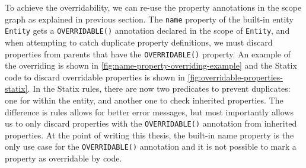       To achieve the overridability, we can re-use the property annotations in the scope graph as explained in previous section. The \texttt{name} property of the built-in entity \texttt{Entity} gets a \texttt{OVERRIDABLE()} annotation declared in the scope of \texttt{Entity}, and when attempting to catch duplicate property definitions, we must discard properties from parents that have the \texttt{OVERRIDABLE()} property. An example of the overriding is shown in \cref{fig:name-property-overriding-example} and the Statix code to discard overridable properties is shown in \cref{fig:overridable-properties-statix}. In the Statix rules, there are now two predicates to prevent duplicates: one for within the entity, and another one to check inherited properties. The difference is rules allows for better error messages, but most importantly allows us to only discard properties with the \texttt{OVERRIDABLE()} annotation from inherited properties. At the point of writing this thesis, the built-in name property is the only use case for the \texttt{OVERRIDABLE()} annotation and it is not possible to mark a property as overridable by code.

